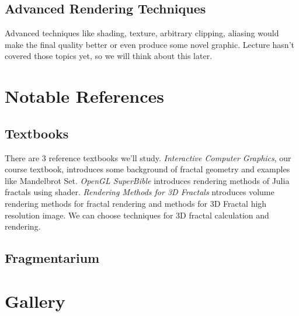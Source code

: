 \documentclass[a4paper]{article}
\begin{document}
\subsection{Advanced Rendering Techniques}
Advanced techniques like shading, texture, arbitrary clipping, aliasing would make the final quality better or even produce some novel graphic.
Lecture hasn't covered those topics yet, so we will think about this later.
\section{Notable References}
\subsection{Textbooks}
There are 3 reference textbooks we'll study.
\textit{Interactive Computer Graphics}\cite{c1}, our course textbook, introduces some background of fractal geometry and examples like Mandelbrot Set.
\textit{OpenGL SuperBible}\cite{c2} introduces rendering methods of Julia fractals using shader.
\textit{Rendering Methods for 3D Fractals}\cite{c3} ntroduces volume rendering methods for fractal rendering and methods for 3D Fractal high resolution image. We can choose techniques for 3D fractal calculation and rendering.

\subsection{Fragmentarium}
\section{Gallery}
\begin{figure}[H]
\centering
{}
\end{figure}
\end{document}
